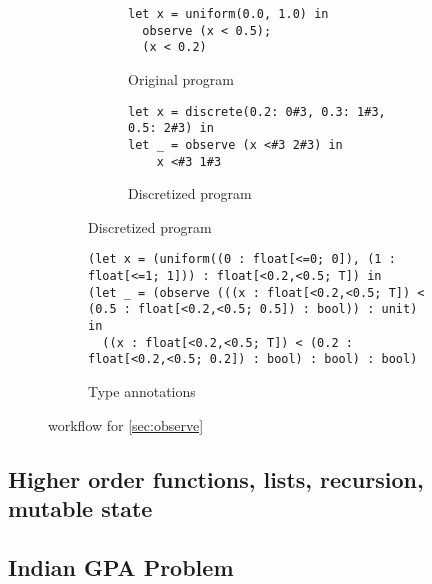 \documentclass[acmsmall,screen,dvipsnames,x11names,nonacm,anonymous,review]{acmart}
\newcommand{\contdice}{\text{\scshape ContDice}\xspace}
\begin{document}
\begin{figure}[ht]
\centering
\begin{subfigure}[t]{0.48\textwidth}  %
  \centering
  \begin{subfigure}[t]{\textwidth}
    \begin{lstlisting}
let x = uniform(0.0, 1.0) in
  observe (x < 0.5);
  (x < 0.2) 
    \end{lstlisting}
    \caption{Original program}
    \label{fig:subA}
  \end{subfigure}

  \vspace{2em} %

  \begin{subfigure}[t]{\textwidth}
    \begin{lstlisting}
let x = discrete(0.2: 0#3, 0.3: 1#3, 0.5: 2#3) in
let _ = observe (x <#3 2#3) in
    x <#3 1#3
    \end{lstlisting}
    \caption{Discretized program}
    \label{fig:subC}
  \end{subfigure}
\end{subfigure}
\hfill
\begin{subfigure}[t]{0.48\textwidth}
\begin{lstlisting}
(let x = (uniform((0 : float[<=0; 0]), (1 : float[<=1; 1])) : float[<0.2,<0.5; T]) in
(let _ = (observe (((x : float[<0.2,<0.5; T]) < (0.5 : float[<0.2,<0.5; 0.5]) : bool)) : unit) in
  ((x : float[<0.2,<0.5; T]) < (0.2 : float[<0.2,<0.5; 0.2]) : bool) : bool) : bool)
\end{lstlisting}
  \caption{Type annotations}
  \label{fig:subB}
\end{subfigure}

\caption{\contdice workflow for \ref{sec:observe}}
\label{fig:main}
\end{figure}


\subsection{Higher order functions, lists, recursion, mutable state}









\subsection{Indian GPA Problem}
\end{document}
